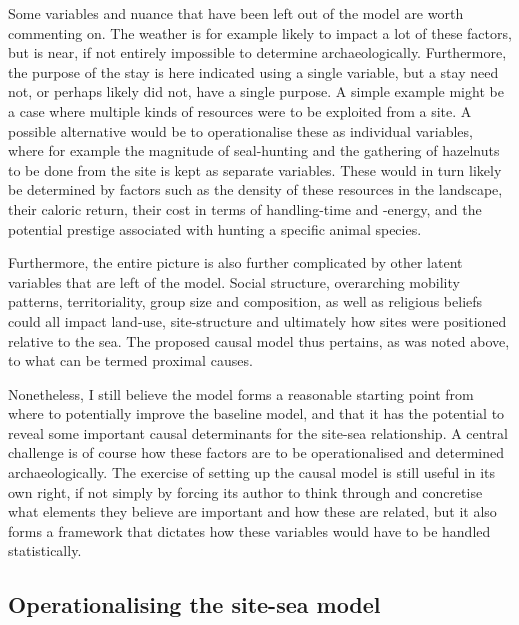 \documentclass[
  12pt,
  a4paper,
  oneside]{book}
\begin{document}
Some variables and nuance that have been left out of the model are worth commenting on. The weather is for example likely to impact a lot of these factors, but is near, if not entirely impossible to determine archaeologically. Furthermore, the purpose of the stay is here indicated using a single variable, but a stay need not, or perhaps likely did not, have a single purpose. A simple example might be a case where multiple kinds of resources were to be exploited from a site. A possible alternative would be to operationalise these as individual variables, where for example the magnitude of seal-hunting and the gathering of hazelnuts to be done from the site is kept as separate variables. These would in turn likely be determined by factors such as the density of these resources in the landscape, their caloric return, their cost in terms of handling-time and -energy, and the potential prestige associated with hunting a specific animal species.

Furthermore, the entire picture is also further complicated by other latent variables that are left of the model. Social structure, overarching mobility patterns, territoriality, group size and composition, as well as religious beliefs could all impact land-use, site-structure and ultimately how sites were positioned relative to the sea. The proposed causal model thus pertains, as was noted above, to what can be termed proximal causes.

Nonetheless, I still believe the model forms a reasonable starting point from where to potentially improve the baseline model, and that it has the potential to reveal some important causal determinants for the site-sea relationship. A central challenge is of course how these factors are to be operationalised and determined archaeologically. The exercise of setting up the causal model is still useful in its own right, if not simply by forcing its author to think through and concretise what elements they believe are important and how these are related, but it also forms a framework that dictates how these variables would have to be handled statistically.

\hypertarget{operationalising-the-site-sea-model}{%
\subsection{Operationalising the site-sea model}\label{operationalising-the-site-sea-model}}
\end{document}
